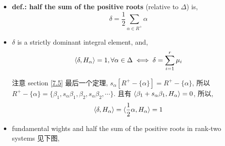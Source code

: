 \begin{itemize}
	\item \textbf{def.: half the sum of the positive roots} (relative to $\Delta$) is,
	\begin{equation}
		\delta = \frac{1}{2} \sum_{\alpha \in R^+} \alpha
	\end{equation}
	
	\item $\delta$ is a strictly dominant integral element, and,
	\begin{equation}
		\braket{\delta, H_\alpha} = 1, \forall \alpha \in \Delta \iff \delta = \sum_{i = 1}^r \mu_i
	\end{equation}
	
	\begin{tcolorbox}[title=proof:]
		注意 section \ref{7.5} 最后一个定理, $s_\alpha[R^+ - \{\alpha\}] = R^+ - \{\alpha\}$, 所以 $R^+ - \{\alpha\} = \{\beta_1, s_\alpha \beta_1, \beta_2, s_\alpha \beta_2, \cdots\}$. 且有 $\braket{\beta_1 + s_\alpha \beta_1, H_\alpha} = 0$, 所以,
		\begin{equation}
			\braket{\delta, H_\alpha} = \braket{\frac{1}{2} \alpha, H_\alpha} = 1
		\end{equation}
	\end{tcolorbox}
	
	\item fundamental wights and half the sum of the positive roots in rank-two systems 见下图,
	

\end{itemize}
